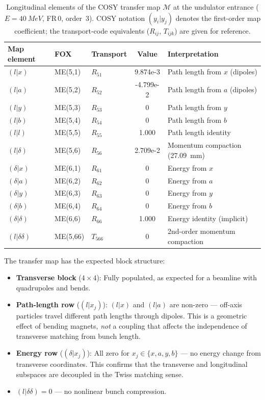 \documentclass[11pt]{article}
\begin{document}
\begin{table}[ht]
\centering
\caption{Longitudinal elements of the COSY transfer map $\mathcal{M}$ at the
  undulator entrance ($E = \SI{40}{MeV}$, FR\,0, order~3).  COSY notation
  $(y_i|y_j)$ denotes the first-order map coefficient; the transport-code
  equivalents ($R_{ij}$, $T_{ijk}$) are given for reference.}
\label{tab:map}
\begin{tabular}{@{} l l l S[table-format=+1.4e-1] l @{}}
\toprule
{Map element} & {FOX} & {Transport} & {Value} & {Interpretation} \\
\midrule
$(l|x)$        & ME(5,1)  & $R_{51}$  &  9.874e-3  & Path length from $x$ (dipoles) \\
$(l|a)$        & ME(5,2)  & $R_{52}$  & -4.799e-2  & Path length from $a$ (dipoles) \\
$(l|y)$        & ME(5,3)  & $R_{53}$  &  0         & Path length from $y$ \\
$(l|b)$        & ME(5,4)  & $R_{54}$  &  0         & Path length from $b$ \\
$(l|l)$        & ME(5,5)  & $R_{55}$  &  1.000     & Path length identity \\
$(l|\delta)$   & ME(5,6)  & $R_{56}$  &  2.709e-2  & Momentum compaction (\SI{27.09}{mm}) \\
\midrule
$(\delta|x)$   & ME(6,1) & $R_{61}$  &  0         & Energy from $x$ \\
$(\delta|a)$   & ME(6,2) & $R_{62}$  &  0         & Energy from $a$ \\
$(\delta|y)$   & ME(6,3) & $R_{63}$  &  0         & Energy from $y$ \\
$(\delta|b)$   & ME(6,4) & $R_{64}$  &  0         & Energy from $b$ \\
$(\delta|\delta)$ & ME(6,6) & $R_{66}$ & 1.000    & Energy identity (implicit) \\
\midrule
$(l|\delta\delta)$ & ME(5,66) & $T_{566}$ & 0     & 2nd-order momentum compaction \\
\bottomrule
\end{tabular}
\end{table}

The transfer map has the expected block structure:
\begin{itemize}
  \item \textbf{Transverse block} ($4\times4$): Fully populated, as expected
    for a beamline with quadrupoles and bends.
  \item \textbf{Path-length row} ($(l|x_j)$): $(l|x)$ and $(l|a)$ are
    non-zero --- off-axis particles travel different path lengths through
    dipoles.  This is a geometric effect of bending magnets, \emph{not} a
    coupling that affects the independence of transverse matching from bunch
    length.
  \item \textbf{Energy row} ($(\delta|x_j)$): All zero for
    $x_j \in \{x, a, y, b\}$ --- no energy change from transverse
    coordinates.  This confirms that the transverse and longitudinal
    subspaces are decoupled in the Twiss matching sense.
  \item $(l|\delta\delta) = 0$ --- no nonlinear bunch compression.
\end{itemize}
\end{document}
